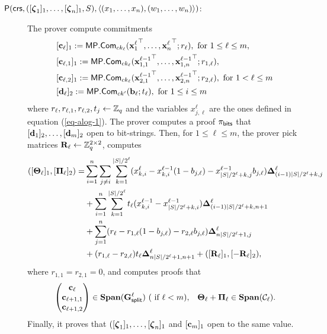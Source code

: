 \begin{description}
\item[{$\mathsf{P}(\mathsf{crs}, ([{\boldsymbol \zeta}_1]_1, \ldots, [{\boldsymbol \zeta}_n]_1,S), \langle (x_1,\ldots,x_n),(w_1,\ldots,w_n) \rangle)$}:]
The prover compute commitments
\begin{align*}
&[\mathbf{c}_\ell]_1:=\mathsf{MP}.\mathsf{Com}_{ck_\ell}({\mathbf{x}^\ell_1}^\top,\ldots,{\mathbf{x}^\ell_n}^\top;r_\ell), \text{ for }1\leq \ell \leq m,\\
&[\mathbf{c}_{\ell,1}]_1:=\mathsf{MP}.\mathsf{Com}_{ck_\ell}({\mathbf{x}^{\ell-1}_{1,1}}^\top,\ldots,{\mathbf{x}^{\ell-1}_{1,n}}^\top;r_{1,\ell}),\\
&[\mathbf{c}_{\ell,2}]_1:=\mathsf{MP}.\mathsf{Com}_{ck_\ell}({\mathbf{x}^{\ell-1}_{2,1}}^\top,\ldots,{\mathbf{x}^{\ell-1}_{2,n}}^\top;r_{2,\ell}), \text{ for } 1<\ell\leq m\\
&[\mathbf{d}_\ell]_2:=\mathsf{MP}.\mathsf{Com}_{ck'}(\mathbf{b}_\ell;t_\ell),\text{ for } 1\leq i\leq m
\end{align*}
 where $r_\ell,r_{\ell,1},r_{\ell,2},t_j\gets\mathbb{Z}_q$ and the variables $x^\ell_{j,\ell}$ are the ones defined in equation (\ref{eq-alog-1}). The prover computes a proof $\pi_{\mathsf{bits}}$ that $[\mathbf{d}_1]_2,\ldots,[\mathbf{d}_m]_2$ open to bit-strings. Then, for $1\leq\ell\leq m$, the prover pick matrices $\mathbf{{R}}_\ell\gets\mathbb{Z}_q^{2\times 2}$, computes
\begin{align*}
([\mathbf{{\Theta}}_\ell]_1,[\mathbf{{\Pi}}_\ell]_2)  = & \sum_{i=1}^n\sum_{j\neq i}\sum_{k=1}^{|S|/2^\ell}(x^\ell_{k,i}-x^{\ell-1}_{k,i}(1-b_{j,\ell})-x^{\ell-1}_{|S|/2^\ell+k,j}b_{j,\ell})\mathbf{{\Delta}}_{(i-1)|S|/2^\ell+k,j}^\ell\\
&+ \sum_{i=1}^n\sum_{k=1}^{|S|/2^\ell}t_\ell(x^{\ell-1}_{k,i}-x^{\ell-1}_{|S|/2^{\ell}+k,i})\mathbf{{\Delta}}_{(i-1)|S|/2^\ell+k,n+1}^\ell \\
&+ \sum_{j=1}^n (r_\ell-r_{1,\ell}(1-b_{j,\ell})-r_{2,\ell}b_{j,\ell})\mathbf{{\Delta}}_{n|S|/2^\ell+1,j}^\ell \\
&+(r_{1,\ell}-r_{2,\ell})t_\ell\mathbf{{\Delta}}^\ell_{n|S|/2^\ell+1,n+1}+([\mathbf{{R}}_\ell]_1,[-\mathbf{{R}}_\ell]_2),
\end{align*}
where $r_{1,1}=r_{2,1}=0$, and computes proofs that
\begin{align*}
&\begin{pmatrix}
\mathbf{c}_{\ell}\\\mathbf{c}_{\ell+1,1}\\\mathbf{c}_{\ell+1,2}
\end{pmatrix}\in
\mathbf{Span}(\mathbf{{G}}^{\ell}_\mathsf{split})\ (\text{ if }\ell< m), &\mathbf{{\Theta_\ell}}+\mathbf{{\Pi_\ell}}\in\mathbf{Span}(\mathcal{C}_\ell).
\end{align*}
Finally, it proves that $([{\boldsymbol \zeta}_1]_1,\ldots,[{\boldsymbol \zeta}_n]_1$ and $[\mathbf{c}_m]_1$ open to the same value.


\end{description}
